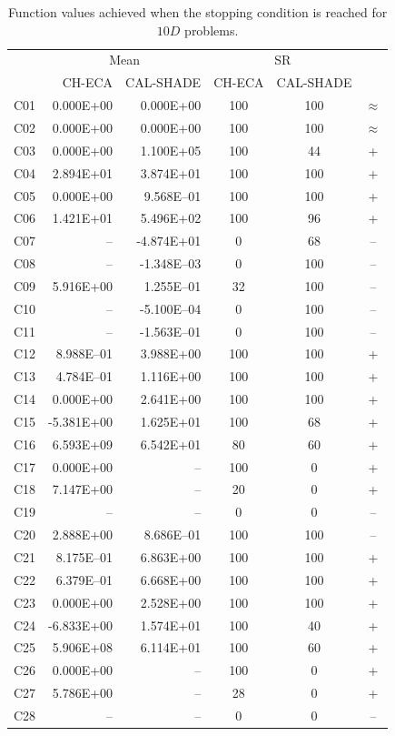 \documentclass[conference]{IEEEtran}
\begin{document}
% 
% 
% 
\begin{table}[!ht]
	\caption{Function values achieved when the stopping condition is reached for $10D$ problems.}
	\centering
	\begin{tabular}{|c|r|r|c|c|c|}
	 \hline
	 &\multicolumn{2}{|c|}{Mean} & \multicolumn{2}{|c|}{SR} & \\
	\cline{2-5}
	    & CH-ECA & CAL-SHADE & CH-ECA & CAL-SHADE & \\ \hline
C01 & 0.000E+00 & 0.000E+00 &  100 &  100 & $\approx$ \\ 
C02 & 0.000E+00 & 0.000E+00 &  100 &  100 & $\approx$ \\ 
C03 & 0.000E+00 & 1.100E+05 &  100 &   44 & + \\ 
C04 & 2.894E+01 & 3.874E+01 &  100 &  100 & + \\ 
C05 & 0.000E+00 & 9.568E--01 &  100 &  100 & + \\ 
C06 & 1.421E+01 & 5.496E+02 &  100 &   96 & + \\ 
C07 &  -- & -4.874E+01 &    0 &   68 & -- \\ 
C08 &  -- & -1.348E--03 &    0 &  100 & -- \\ 
C09 & 5.916E+00 & 1.255E--01 &   32 &  100 & -- \\ 
C10 &  -- & -5.100E--04 &    0 &  100 & -- \\ 
C11 &  -- & -1.563E--01 &    0 &  100 & -- \\ 
C12 & 8.988E--01 & 3.988E+00 &  100 &  100 & + \\ 
C13 & 4.784E--01 & 1.116E+00 &  100 &  100 & + \\ 
C14 & 0.000E+00 & 2.641E+00 &  100 &  100 & + \\ 
C15 & -5.381E+00 & 1.625E+01 &  100 &   68 & + \\ 
C16 & 6.593E+09 & 6.542E+01 &   80 &   60 & + \\ 
C17 & 0.000E+00 &  -- &  100 &    0 & + \\ 
C18 & 7.147E+00 &  -- &   20 &    0 & + \\ 
C19 &  -- &  -- &    0 &    0 & -- \\ 
C20 & 2.888E+00 & 8.686E--01 &  100 &  100 & -- \\ 
C21 & 8.175E--01 & 6.863E+00 &  100 &  100 & + \\ 
C22 & 6.379E--01 & 6.668E+00 &  100 &  100 & + \\ 
C23 & 0.000E+00 & 2.528E+00 &  100 &  100 & + \\ 
C24 & -6.833E+00 & 1.574E+01 &  100 &   40 & + \\ 
C25 & 5.906E+08 & 6.114E+01 &  100 &   60 & + \\ 
C26 & 0.000E+00 &  -- &  100 &    0 & + \\ 
C27 & 5.786E+00 &  -- &   28 &    0 & + \\ 
C28 &  -- &  -- &    0 &    0 & -- \\ 
   \hline
	\end{tabular}
	\label{tab:d10c}
\end{table}
\end{document}
